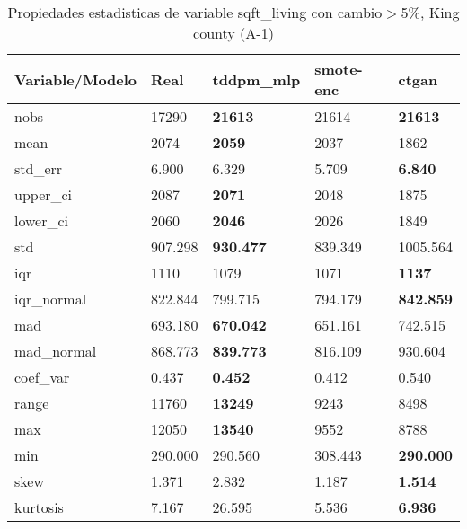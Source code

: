 \begin{table}[H]
\centering
\fontsize{8}{14}\selectfont
\caption{Propiedades estadisticas de variable sqft\_living con cambio\ensuremath{>}5\%, King county (A-1)}
\label{table-stats-king county-a-1-sqft_living-short}
\begin{tabular}{|l|m{10em}|m{10em}|m{10em}|m{10em}|}
\hline
 \rowcolor[gray]{0.8}
Variable/Modelo & Real & tddpm\_mlp & smote-enc & ctgan \\
\hline nobs & 17290 & \bfseries 21613 & \cellcolor[rgb]{0.9, 0.54, 0.52} 21614 & \bfseries 21613 \\
\hline mean & 2074 & \bfseries 2059 & 2037 & \cellcolor[rgb]{0.9, 0.54, 0.52} 1862 \\
\hline std\_err & 6.900 & 6.329 & \cellcolor[rgb]{0.9, 0.54, 0.52} 5.709 & \bfseries 6.840 \\
\hline upper\_ci & 2087 & \bfseries 2071 & 2048 & \cellcolor[rgb]{0.9, 0.54, 0.52} 1875 \\
\hline lower\_ci & 2060 & \bfseries 2046 & 2026 & \cellcolor[rgb]{0.9, 0.54, 0.52} 1849 \\
\hline std & 907.298 & \bfseries 930.477 & 839.349 & \cellcolor[rgb]{0.9, 0.54, 0.52} 1005.564 \\
\hline iqr & 1110 & 1079 & \cellcolor[rgb]{0.9, 0.54, 0.52} 1071 & \bfseries 1137 \\
\hline iqr\_normal & 822.844 & 799.715 & \cellcolor[rgb]{0.9, 0.54, 0.52} 794.179 & \bfseries 842.859 \\
\hline mad & 693.180 & \bfseries 670.042 & 651.161 & \cellcolor[rgb]{0.9, 0.54, 0.52} 742.515 \\
\hline mad\_normal & 868.773 & \bfseries 839.773 & 816.109 & \cellcolor[rgb]{0.9, 0.54, 0.52} 930.604 \\
\hline coef\_var & 0.437 & \bfseries 0.452 & 0.412 & \cellcolor[rgb]{0.9, 0.54, 0.52} 0.540 \\
\hline range & 11760 & \bfseries 13249 & 9243 & \cellcolor[rgb]{0.9, 0.54, 0.52} 8498 \\
\hline max & 12050 & \bfseries 13540 & 9552 & \cellcolor[rgb]{0.9, 0.54, 0.52} 8788 \\
\hline min & 290.000 & 290.560 & \cellcolor[rgb]{0.9, 0.54, 0.52} 308.443 & \bfseries 290.000 \\
\hline skew & 1.371 & \cellcolor[rgb]{0.9, 0.54, 0.52} 2.832 & 1.187 & \bfseries 1.514 \\
\hline kurtosis & 7.167 & \cellcolor[rgb]{0.9, 0.54, 0.52} 26.595 & 5.536 & \bfseries 6.936 \\

\end{tabular}
\end{table}
